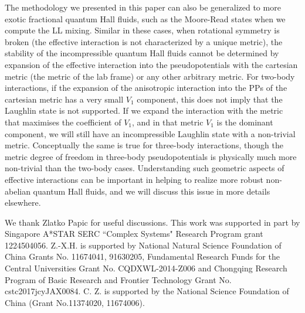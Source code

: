\documentclass[twocolumn,showpacs,amsmath,amstex,amssymb,mathfonts,prb]{revtex4-1}
\begin{document}
The methodology we presented in this paper can also be generalized to more exotic fractional quantum Hall fluids, such as the Moore-Read states when we compute the LL mixing. Similar in these cases, when rotational symmetry is broken (the effective interaction is not characterized by a unique metric), the stability of the incompressible quantum Hall fluids cannot be determined by expansion of the effective interaction into the pseudopotentials with the cartesian metric (the metric of the lab frame) or any other arbitrary metric. For two-body interactions, if the expansion of the anisotropic interaction into the PPs of the cartesian metric has a very small $V_1$ component, this does not imply that the Laughlin state is not supported. If we expand the interaction with the metric that maximises the coefficient of $V_1$, and in that metric $V_1$ is the dominant component, we will still have an incompressible Laughlin state with a non-trivial metric. Conceptually the same is true for three-body interactions, though the metric degree of freedom in three-body pseudopotentials is physically much more non-trivial than the two-body cases\cite{yang_future}. Understanding such geometric aspects of effective interactions can be important in helping to realize more robust non-abelian quantum Hall fluids, and we will discuss this issue in more details elsewhere.

\begin{acknowledgements}
We thank Zlatko Papic for useful discussions. This work was supported in part by Singapore A*STAR SERC ``Complex Systems" Research Program grant 1224504056. Z.-X.H. is supported by National Natural Science Foundation of China Grants No. 11674041, 91630205, Fundamental Research Funds for the Central Universities Grant No. CQDXWL-2014-Z006 and Chongqing Research Program of Basic Research and Frontier Technology Grant No. cstc2017jcyJAX0084. C. Z. is supported by the National Science Foundation of China (Grant No.11374020, 11674006).
\end{acknowledgements}
\end{document}

